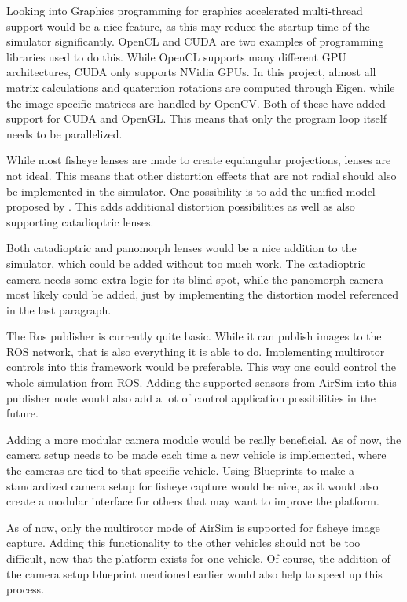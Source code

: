 Looking into Graphics programming for graphics accelerated multi-thread support would be a nice feature, as this may reduce the startup time of the simulator significantly. OpenCL and CUDA are two examples of programming libraries used to do this. While OpenCL supports many different GPU architectures, CUDA only supports NVidia GPUs. In this project, almost all matrix calculations and quaternion rotations are computed through Eigen, while the image specific matrices are handled by OpenCV. Both of these have added support for CUDA and OpenGL. This means that only the program loop itself needs to be parallelized.

While most fisheye lenses are made to create equiangular projections, lenses are not ideal. This means that other distortion effects that are not radial should also be implemented in the simulator. One possibility is to add the unified model proposed by \cite{FisheyeKalibration}. This adds additional distortion possibilities as well as also supporting catadioptric lenses.

Both catadioptric and panomorph lenses would be a nice addition to the simulator, which could be added without too much work. The catadioptric camera needs some extra logic for its blind spot, while the panomorph camera most likely could be added, just by implementing the distortion model referenced in the last paragraph.

The Ros publisher is currently quite basic. While it can publish images to the ROS network, that is also everything it is able to do. Implementing multirotor controls into this framework would be preferable. This way one could control the whole simulation from ROS. Adding the supported sensors from AirSim into this publisher node would also add a lot of control application possibilities in the future.

Adding a more modular camera module would be really beneficial. As of now, the camera setup needs to be made each time a new vehicle is implemented, where the cameras are tied to that specific vehicle. Using Blueprints to make a standardized camera setup for fisheye capture would be nice, as it would also create a modular interface for others that may want to improve the platform.

As of now, only the multirotor mode of AirSim is supported for fisheye image capture. Adding this functionality to the other vehicles should not be too difficult, now that the platform exists for one vehicle. Of course, the addition of the camera setup blueprint mentioned earlier would also help to speed up this process.

